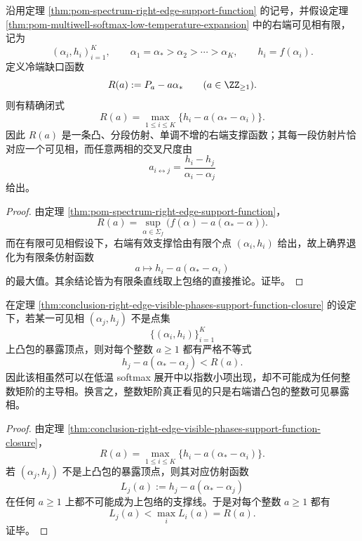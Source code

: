 \begin{theorem}[右端可见相的支撑函数闭包]\label{thm:conclusion-right-edge-visible-phases-support-function-closure}
沿用定理 \ref{thm:pom-spectrum-right-edge-support-function} 的记号，并假设定理 \ref{thm:pom-multiwell-softmax-low-temperature-expansion} 中的右端可见相有限，记为
\[
(\alpha_i,h_i)_{i=1}^{K},
\qquad
\alpha_1=\alpha_\ast>\alpha_2>\cdots>\alpha_K,
\qquad
h_i=f(\alpha_i).
\]
定义冷端缺口函数
\[
R(a):=P_a-a\alpha_\ast
\qquad
(a\in\ZZ_{\ge 1}).
\]
则有精确闭式
\[
R(a)=\max_{1\le i\le K}\bigl\{h_i-a(\alpha_\ast-\alpha_i)\bigr\}.
\]
因此 \(R(a)\) 是一条凸、分段仿射、单调不增的右端支撑函数；其每一段仿射片恰对应一个可见相，而任意两相的交叉尺度由
\[
a_{i\leftrightarrow j}
=
\frac{h_i-h_j}{\alpha_i-\alpha_j}
\]
给出。
\end{theorem}
\begin{proof}
由定理 \ref{thm:pom-spectrum-right-edge-support-function}，
\[
R(a)=\sup_{\alpha\in\Sigma_f}\bigl(f(\alpha)-a(\alpha_\ast-\alpha)\bigr).
\]
而在有限可见相假设下，右端有效支撑恰由有限个点 \((\alpha_i,h_i)\) 给出，故上确界退化为有限条仿射函数
\[
a\longmapsto h_i-a(\alpha_\ast-\alpha_i)
\]
的最大值。其余结论皆为有限条直线取上包络的直接推论。证毕。
\end{proof}

\begin{corollary}[不可见相与整数矩阶的暴露失败]\label{cor:conclusion-nonexposed-phase-fails-integer-domination}
在定理 \ref{thm:conclusion-right-edge-visible-phases-support-function-closure} 的设定下，若某一可见相 \((\alpha_j,h_j)\) 不是点集
\[
\{(\alpha_i,h_i)\}_{i=1}^{K}
\]
上凸包的暴露顶点，则对每个整数 \(a\ge 1\) 都有严格不等式
\[
h_j-a(\alpha_\ast-\alpha_j)<R(a).
\]
因此该相虽然可以在低温 softmax 展开中以指数小项出现，却不可能成为任何整数矩阶的主导相。换言之，整数矩阶真正看见的只是右端谱凸包的整数可见暴露相。
\end{corollary}
\begin{proof}
由定理 \ref{thm:conclusion-right-edge-visible-phases-support-function-closure}，
\[
R(a)=\max_{1\le i\le K}\bigl\{h_i-a(\alpha_\ast-\alpha_i)\bigr\}.
\]
若 \((\alpha_j,h_j)\) 不是上凸包的暴露顶点，则其对应仿射函数
\[
L_j(a):=h_j-a(\alpha_\ast-\alpha_j)
\]
在任何 \(a\ge 1\) 上都不可能成为上包络的支撑线。于是对每个整数 \(a\ge 1\) 都有
\[
L_j(a)<\max_i L_i(a)=R(a).
\]
证毕。
\end{proof}

